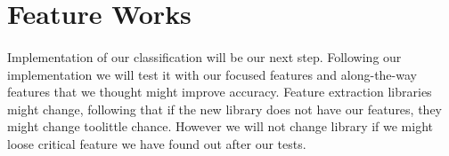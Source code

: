 \documentclass[10pt,twocolumn,letterpaper]{article}
\begin{document}
\section{Feature Works}
\paragraph{}Implementation of our classification will be our next step. Following our implementation we will test it with our focused features and along-the-way features that we thought might improve accuracy. Feature extraction libraries might change, following that if the new library does not have our features, they might change too\textemdash little chance. However we will not change library if we might loose critical feature we have found out after our tests. 


{\small


}
\end{document}
